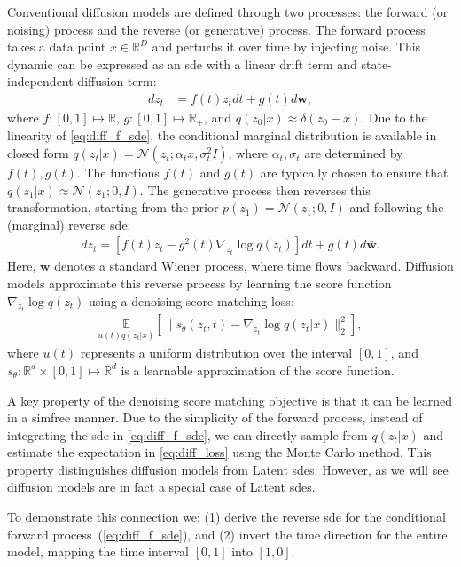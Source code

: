 \documentclass{article}
\def\N{\mathcal{N}}
\def\E{\mathbb{E}}
\def\R{\mathbb{R}}
\def\w{\mathbf{w}}
\def\bw{\bar{\w}}
\def\a{\alpha}
\def\s{\sigma}
\def\d{\delta}
\def\th{\theta}
\def\n{\nabla}
\theoremstyle{plain}
\theoremstyle{definition}
\theoremstyle{remark}
\begin{document}
Conventional diffusion models are defined through two processes: the forward (or noising) process and the reverse (or generative) process. The forward process takes a data point $x \in \R^D$ and perturbs it over time by injecting noise. This dynamic can be expressed as an \gls{sde} with a linear drift term and state-independent diffusion term:
\begin{align}
    d z_t &= f(t) z_t d t + g(t) d \w,
    \label{eq:diff_f_sde}
\end{align}
where $f : [0, 1] \mapsto \R$, $g : [0, 1] \mapsto \R_+$, and $q(z_0|x) \approx \d(z_0 - x)$. Due to the linearity of \cref{eq:diff_f_sde}, the conditional marginal distribution is available in closed form $q(z_t|x) = \N(z_t; \a_t x, \s_t^2 I)$, where $\a_t, \s_t$ are determined by $f(t), g(t)$. The functions $f(t)$ and $g(t)$ are typically chosen to ensure that $q(z_1|x) \approx \N(z_1;0, I)$. The generative process then reverses this transformation, starting from the prior $p(z_1) = \N(z_1;0, I)$ and following the (marginal) reverse \gls{sde}:
\begin{align}
    d z_t = [ f(t) z_t - g^2(t) \n_{z_t} \log q(z_t) ] d t + g(t) d \bw.
    \label{eq:diff_marginal_f_rsde}
\end{align}
Here, $\bw$ denotes a standard Wiener process, where time flows backward. Diffusion models approximate this reverse process by learning the score function $\n_{z_t} \log q(z_t)$ using a denoising score matching loss:
\begin{align}
    \underset{u(t) q(z_t|x)}{\E} \left[ \big\| s_\th(z_t, t) - \n_{z_t} \log q(z_t|x) \big\|_2^2 \right],
    \label{eq:diff_loss}
\end{align}
where $u(t)$ represents a uniform distribution over the interval $[0, 1]$, and $s_\th: \R^d \times [0, 1] \mapsto \R^d$ is a learnable approximation of the score function.


A key property of the denoising score matching objective is that it can be learned in a \gls{simfree} manner. Due to the simplicity of the forward process, instead of integrating the \gls{sde} in \cref{eq:diff_f_sde}, we can directly sample from $q(z_t|x)$ and estimate the expectation in \cref{eq:diff_loss} using the Monte Carlo method. This property distinguishes diffusion models from Latent \glspl{sde}. However, as we will see diffusion models are in fact a special case of Latent \glspl{sde}.


To demonstrate this connection we: (1) derive the reverse \gls{sde} for the conditional forward process~(\cref{eq:diff_f_sde}), and (2) invert the time direction for the entire model, mapping the time interval $[0,1]$ into $[1,0]$. 
\end{document}
